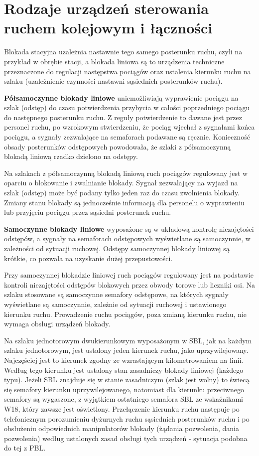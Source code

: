 \chapter{Rodzaje urządzeń sterowania ruchem kolejowym i łączności}

Blokada stacyjna uzależnia nastawnie tego samego posterunku ruchu, czyli na przykład w obrębie stacji, a blokada liniowa są to urządzenia techniczne przeznaczone do regulacji następstwa pociągów oraz ustalenia kierunku ruchu na szlaku (uzależnienie czynności nastawni sąsiednich posterunków ruchu). 

\textbf{Półsamoczynne blokady liniowe} uniemożliwiają wyprawienie pociągu na szlak (odstęp) do czasu potwierdzenia przybycia w całości poprzedniego pociągu do następnego posterunku ruchu. Z reguły potwierdzenie to dawane jest przez personel ruchu, po wzrokowym stwierdzeniu, że pociąg wjechał z sygnałami końca pociągu, a sygnały zezwalające na semaforach podawane są ręcznie. Konieczność obsady posterunków odstępowych powodowała, że szlaki z półsamoczynną blokadą liniową rzadko dzielono na odstępy.

Na szlakach z półsamoczynną blokadą liniową ruch pociągów regulowany jest w oparciu o blokowanie i zwalnianie blokady. Sygnał zezwalający na wyjazd na szlak (odstęp) może być podany tylko jeden raz do czasu zwolnienia blokady. Zmiany stanu blokady są jednocześnie informacją dla personelu o wyprawieniu lub przyjęciu pociągu przez sąsiedni posterunek ruchu.

\textbf{Samoczynne blokady liniowe} wyposażone są w układową kontrolę niezajętości odstępów, a sygnały na semaforach odstępowych wyświetlane są samoczynnie, w zależności od sytuacji ruchowej. Odstępy samoczynnej blokady liniowej są krótkie, co pozwala na uzyskanie dużej przepustowości.

Przy samoczynnej blokadzie liniowej ruch pociągów regulowany jest na podstawie kontroli niezajętości odstępów blokowych przez obwody torowe lub liczniki osi. Na szlaku stosowane są samoczynne semafory odstępowe, na których sygnały wyświetlane są samoczynnie, zależnie od sytuacji ruchowej i ustawionego kierunku ruchu. Prowadzenie ruchu pociągów, poza zmianą kierunku ruchu, nie wymaga obsługi urządzeń blokady.

Na szlaku jednotorowym dwukierunkowym wyposażonym w SBL, jak na każdym szlaku jednotorowym, jest ustalony jeden kierunek ruchu, jako uprzywilejowany. Najczęściej jest to kierunek zgodny ze wzrastającym kilometrowaniem na linii. Według tego kierunku jest ustalony stan zasadniczy blokady liniowej (każdego typu). 
Jeżeli SBL znajduje się w stanie zasadniczym (szlak jest wolny) to świecą się semafory kierunku uprzywilejowanego, natomiast dla kierunku przeciwnego semafory są wygaszone, z wyjątkiem ostatniego semafora SBL ze wskaźnikami W18, który zawsze jest oświetlony. 
Przełączenie kierunku ruchu następuje po telefonicznym porozumieniu dyżurnych ruchu sąsiednich posterunków ruchu i po obsłużeniu odpowiednich manipulatorów blokady (żądania pozwolenia, dania pozwolenia) według ustalonych zasad obsługi tych urządzeń - sytuacja podobna do tej z PBL. 


